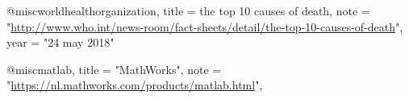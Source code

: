 @misc{worldhealthorganization,
	title  = {the top 10 causes of death},
	note =  "\url{http://www.who.int/news-room/fact-sheets/detail/the-top-10-causes-of-death}",
	year   = "24 may 2018"
}

@misc{matlab,
	title  = "MathWorks",
	note =  "\url{https://nl.mathworks.com/products/matlab.html}",
}



